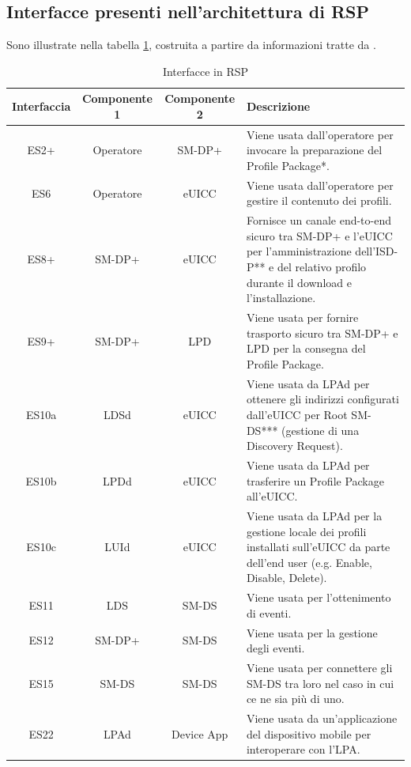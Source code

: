 \documentclass[10pt, twoside, openany]{book}
\begin{document}
\subsection{Interfacce presenti nell'architettura di RSP}
Sono illustrate nella tabella \ref{tab:interfaces}, costruita a partire da informazioni tratte da \cite{GSMA-docs-new}.\\
\begin{table}[h!]
\begin{center}
\captionsetup{skip=4pt}
\caption{Interfacce in RSP}
\label{tab:interfaces}
\begin{tabularx}{\textwidth}{|c|c|c|X|} %
\hline
\textbf{Interfaccia} & \textbf{Componente 1} & \textbf{Componente 2} & \textbf{Descrizione}\\
\hline
ES2+ & Operatore & SM-DP+ & Viene usata dall'operatore per invocare la preparazione del Profile Package*.\\
\hline
ES6 & Operatore & eUICC & Viene usata dall'operatore per gestire il contenuto dei profili.\\
\hline
ES8+ & SM-DP+ & eUICC & Fornisce un canale end-to-end sicuro tra SM-DP+ e l'eUICC per l'amministrazione dell'ISD-P** e del relativo profilo durante il download e l'installazione.\\
\hline
ES9+ & SM-DP+ & LPD & Viene usata per fornire trasporto sicuro tra SM-DP+ e LPD per la consegna del Profile Package.\\
\hline
ES10a & LDSd & eUICC & Viene usata da LPAd per ottenere gli indirizzi configurati dall'eUICC per Root SM-DS*** (gestione di una Discovery Request).\\
\hline
ES10b & LPDd & eUICC & Viene usata da LPAd per trasferire un Profile Package all'eUICC.\\
\hline
ES10c & LUId & eUICC & Viene usata da LPAd per la gestione locale dei profili installati sull'eUICC da parte dell'end user (e.g. Enable, Disable, Delete).\\
\hline
ES11 & LDS & SM-DS & Viene usata per l'ottenimento di eventi.\\
\hline
ES12 & SM-DP+ & SM-DS & Viene usata per la gestione degli eventi.\\
\hline
ES15 & SM-DS & SM-DS & Viene usata per connettere gli SM-DS tra loro nel caso in cui ce ne sia più di uno.\\
\hline
ES22 & LPAd & Device App & Viene usata da un'applicazione del dispositivo mobile per interoperare con l'LPA.\\

\end{tabularx}
\end{center}
\end{table}
\end{document}
